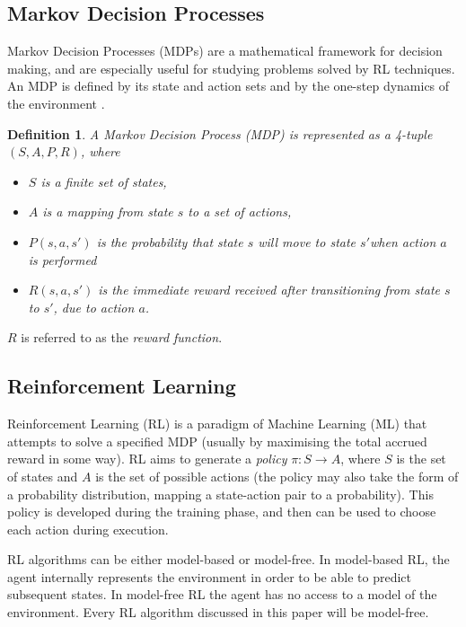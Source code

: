 \newtheorem{definition}{Definition}[subsection]


\subsection{Markov Decision Processes}
Markov Decision Processes (MDPs) are a mathematical framework for decision making, and are especially useful for studying problems solved by RL techniques. An MDP is defined by its state and action sets and by the one-step dynamics of the environment \cite{RLAnIntro}.

\begin{definition}

A Markov Decision Process (MDP) is represented as a 4-tuple $(S, A, P, R)$, where
\begin{itemize}
  \item $S$ is a finite set of states,
  \item $A$ is a mapping from state $s$ to a set of actions,
  \item $P(s, a, s')$ is the probability that state $s$ will move to state $s'$when action $a$ is performed
  \item $R(s, a, s')$ is the immediate reward received after transitioning from state $s$ to $s'$, due to action $a$.
\end{itemize}  

\end{definition}
$R$ is referred to as the \textit{reward function}. 

\subsection{Reinforcement Learning}
Reinforcement Learning (RL) is a paradigm of Machine Learning (ML) that attempts to solve a specified MDP (usually by maximising the total accrued reward in some way). RL aims to generate a \textit{policy} $\pi : S \to A$, where $S$ is the set of states and $A$ is the set of possible actions (the policy may also take the form of a probability distribution, mapping a state-action pair to a probability). This policy is developed during the training phase, and then can be used to choose each action during execution.

RL algorithms can be either model-based or model-free. In model-based RL, the agent internally represents the environment in order to be able to predict subsequent states. In model-free RL the agent has no access to a model of the environment. Every RL algorithm discussed in this paper will be model-free.

